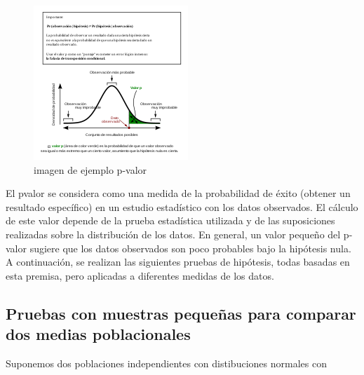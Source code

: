 \begin{figure}[h]
\centering
\includegraphics[width=\textwidth]{Img/cap2/pvalor.png}
\caption{imagen de ejemplo p-valor}
\end{figure}

El p\-valor se considera como una medida de la probabilidad de éxito (obtener un resultado específico) en un estudio estadístico con los datos observados. El cálculo de este valor depende de la prueba estadística utilizada y de las suposiciones realizadas sobre la distribución de los datos. En general, un valor pequeño del p-valor sugiere que los datos observados son poco probables bajo la hipótesis nula.\\
A continuación, se realizan las siguientes pruebas de hipótesis, todas basadas en esta premisa, pero aplicadas a diferentes medidas de los datos. \\
	

\subsection{Pruebas con muestras pequeñas para comparar dos medias poblacionales}

Suponemos dos poblaciones independientes con distibuciones normales con 

